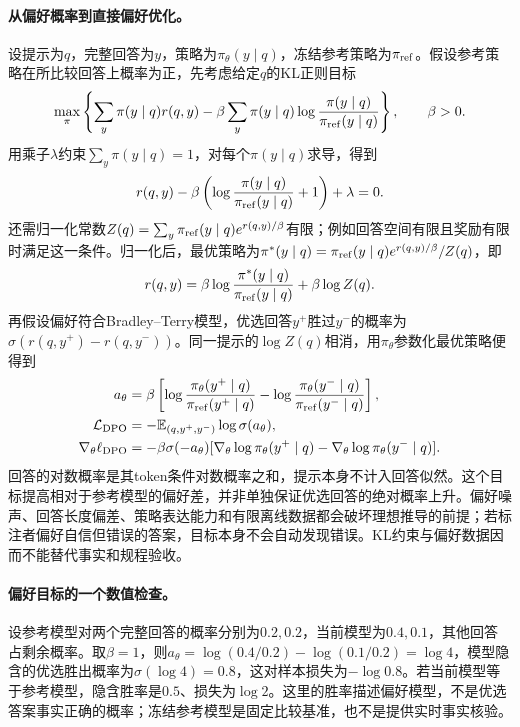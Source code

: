 \paragraph{从偏好概率到直接偏好优化。}
设提示为$q$，完整回答为$y$，策略为$\pi_\theta(y\mid q)$，冻结参考策略为$\pi_{\rm ref}$。假设参考策略在所比较回答上概率为正，先考虑给定$q$的KL正则目标
\begin{equation}
 \max_\pi\left\{\sum_y\pi(y\mid q)r(q,y)
 -\beta\sum_y\pi(y\mid q)\log\frac{\pi(y\mid q)}{\pi_{\rm ref}(y\mid q)}\right\},\qquad\beta>0.
\end{equation}
用乘子$\lambda$约束$\sum_y\pi(y\mid q)=1$，对每个$\pi(y\mid q)$求导，得到
\begin{equation}
 r(q,y)-\beta\left(\log\frac{\pi(y\mid q)}{\pi_{\rm ref}(y\mid q)}+1\right)+\lambda=0.
\end{equation}
还需归一化常数$Z(q)=\sum_y\pi_{\rm ref}(y\mid q)e^{r(q,y)/\beta}$有限；例如回答空间有限且奖励有限时满足这一条件。归一化后，最优策略为$\pi^*(y\mid q)=\pi_{\rm ref}(y\mid q)e^{r(q,y)/\beta}/Z(q)$，即
\begin{equation}
 r(q,y)=\beta\log\frac{\pi^*(y\mid q)}{\pi_{\rm ref}(y\mid q)}+\beta\log Z(q).
\end{equation}
再假设偏好符合Bradley--Terry模型，优选回答$y^+$胜过$y^-$的概率为$\sigma(r(q,y^+)-r(q,y^-))$。同一提示的$\log Z(q)$相消，用$\pi_\theta$参数化最优策略便得到
\begin{align}
 a_\theta&=\beta\left[\log\frac{\pi_\theta(y^+\mid q)}{\pi_{\rm ref}(y^+\mid q)}-
 \log\frac{\pi_\theta(y^-\mid q)}{\pi_{\rm ref}(y^-\mid q)}\right],\\
 \mathcal L_{\rm DPO}&=-\mathbb{E}_{(q,y^+,y^-)}\log\sigma(a_\theta),\\
 \nabla_\theta\ell_{\rm DPO}&=-\beta\sigma(-a_\theta)
 [\nabla_\theta\log\pi_\theta(y^+\mid q)-\nabla_\theta\log\pi_\theta(y^-\mid q)].
\end{align}
回答的对数概率是其token条件对数概率之和，提示本身不计入回答似然。这个目标提高相对于参考模型的偏好差，并非单独保证优选回答的绝对概率上升。偏好噪声、回答长度偏差、策略表达能力和有限离线数据都会破坏理想推导的前提；若标注者偏好自信但错误的答案，目标本身不会自动发现错误。KL约束与偏好数据因而不能替代事实和规程验收。

\paragraph{偏好目标的一个数值检查。}
设参考模型对两个完整回答的概率分别为$0.2,0.2$，当前模型为$0.4,0.1$，其他回答占剩余概率。取$\beta=1$，则$a_\theta=\log(0.4/0.2)-\log(0.1/0.2)=\log4$，模型隐含的优选胜出概率为$\sigma(\log4)=0.8$，这对样本损失为$-\log0.8$。若当前模型等于参考模型，隐含胜率是$0.5$、损失为$\log2$。这里的胜率描述偏好模型，不是优选答案事实正确的概率；冻结参考模型是固定比较基准，也不是提供实时事实核验。

